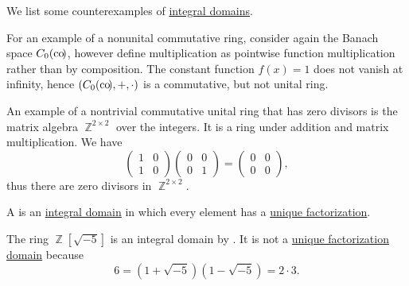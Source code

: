 \begin{example}\label{ex:def:integral_domain}
  We list some counterexamples of \hyperref[def:integral_domain]{integral domains}.

  \begin{refenum}
     For an example of a nonunital commutative ring, consider again the Banach space \( C_0(\operatorname*{co\negthinspace)} \), however define multiplication as pointwise function multiplication rather than by composition. The constant function \( f(x) = 1 \) does not vanish at infinity, hence \( (C_0(\operatorname*{co\negthinspace)}, +, \cdot) \) is a commutative, but not unital ring.

     An example of a nontrivial commutative unital ring that has zero divisors is the matrix algebra \( \BbbZ^{2 \times 2} \) over the integers. It is a ring under addition and matrix multiplication. We have
    \begin{equation*}
      \begin{pmatrix}
        1 & 0 \\
        1 & 0
      \end{pmatrix}
      \begin{pmatrix}
        0 & 0 \\
        0 & 1
      \end{pmatrix}
      =
      \begin{pmatrix}
        0 & 0 \\
        0 & 0
      \end{pmatrix},
    \end{equation*}
    thus there are zero divisors in \( \BbbZ^{2 \times 2} \).
  \end{refenum}
\end{example}

\begin{definition}\label{def:unique_factorization_domain}
  A  is an \hyperref[def:integral_domain]{integral domain} in which every element has a \hyperref[def:factorization_in_ring]{unique factorization}.
\end{definition}

\begin{example}\label{ex:integral_domain_not_ufd}
  The ring \( \BbbZ[\sqrt{-5}] \) is an integral domain by . It is not a \hyperref[def:unique_factorization_domain]{unique factorization domain} because
  \begin{equation*}
    6 = (1 + \sqrt{-5}) (1 - \sqrt{-5}) = 2 \cdot 3.
  \end{equation*}
\end{example}

